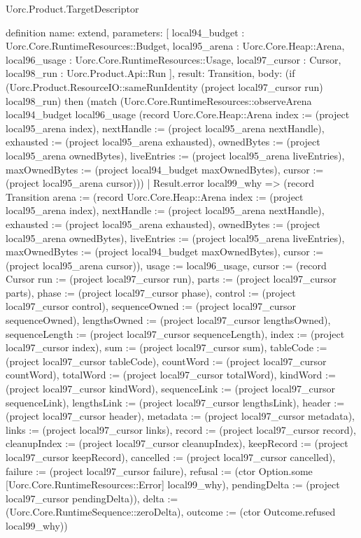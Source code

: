 \begin{lexlean}{Uorc.Product.TargetDescriptor}
\begin{semanticmodule}
definition{
  name: extend,
  parameters: [
    local94_budget : Uorc.Core.RuntimeResources::Budget,
    local95_arena : Uorc.Core.Heap::Arena,
    local96_usage : Uorc.Core.RuntimeResources::Usage,
    local97_cursor : Cursor,
    local98_run : Uorc.Product.Api::Run
  ],
  result: Transition,
  body: (if (Uorc.Product.ResourceIO::sameRunIdentity (project local97_cursor run) local98_run) then (match (Uorc.Core.RuntimeResources::observeArena local94_budget local96_usage (record Uorc.Core.Heap::Arena {index := (project local95_arena index), nextHandle := (project local95_arena nextHandle), exhausted := (project local95_arena exhausted), ownedBytes := (project local95_arena ownedBytes), liveEntries := (project local95_arena liveEntries), maxOwnedBytes := (project local94_budget maxOwnedBytes), cursor := (project local95_arena cursor)}))
    | Result.error local99_why => (record Transition {arena := (record Uorc.Core.Heap::Arena {index := (project local95_arena index), nextHandle := (project local95_arena nextHandle), exhausted := (project local95_arena exhausted), ownedBytes := (project local95_arena ownedBytes), liveEntries := (project local95_arena liveEntries), maxOwnedBytes := (project local94_budget maxOwnedBytes), cursor := (project local95_arena cursor)}), usage := local96_usage, cursor := (record Cursor {run := (project local97_cursor run), parts := (project local97_cursor parts), phase := (project local97_cursor phase), control := (project local97_cursor control), sequenceOwned := (project local97_cursor sequenceOwned), lengthsOwned := (project local97_cursor lengthsOwned), sequenceLength := (project local97_cursor sequenceLength), index := (project local97_cursor index), sum := (project local97_cursor sum), tableCode := (project local97_cursor tableCode), countWord := (project local97_cursor countWord), totalWord := (project local97_cursor totalWord), kindWord := (project local97_cursor kindWord), sequenceLink := (project local97_cursor sequenceLink), lengthsLink := (project local97_cursor lengthsLink), header := (project local97_cursor header), metadata := (project local97_cursor metadata), links := (project local97_cursor links), record := (project local97_cursor record), cleanupIndex := (project local97_cursor cleanupIndex), keepRecord := (project local97_cursor keepRecord), cancelled := (project local97_cursor cancelled), failure := (project local97_cursor failure), refusal := (ctor Option.some [Uorc.Core.RuntimeResources::Error] local99_why), pendingDelta := (project local97_cursor pendingDelta)}), delta := (Uorc.Core.RuntimeSequence::zeroDelta), outcome := (ctor Outcome.refused local99_why)})
}
\end{semanticmodule}
\end{lexlean}
